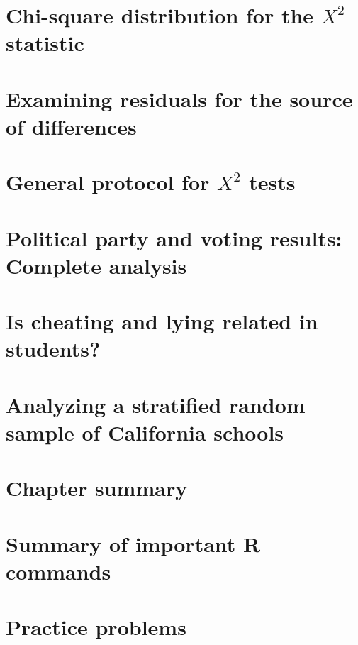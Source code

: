 \documentclass[]{book}
\begin{document}
\hypertarget{section5-6}{%
\section{\texorpdfstring{Chi-square distribution for the \(X^2\) statistic}{Chi-square distribution for the X\^{}2 statistic}}\label{section5-6}}

\hypertarget{section5-7}{%
\section{Examining residuals for the source of differences}\label{section5-7}}

\hypertarget{section5-8}{%
\section{\texorpdfstring{General protocol for \(X^2\) tests}{General protocol for X\^{}2 tests}}\label{section5-8}}

\hypertarget{section5-9}{%
\section{Political party and voting results: Complete analysis}\label{section5-9}}

\hypertarget{section5-10}{%
\section{Is cheating and lying related in students?}\label{section5-10}}

\hypertarget{section5-11}{%
\section{Analyzing a stratified random sample of California schools}\label{section5-11}}

\hypertarget{section5-12}{%
\section{Chapter summary}\label{section5-12}}

\hypertarget{section5-13}{%
\section{Summary of important R commands}\label{section5-13}}

\hypertarget{section5-14}{%
\section{Practice problems}\label{section5-14}}
\end{document}
